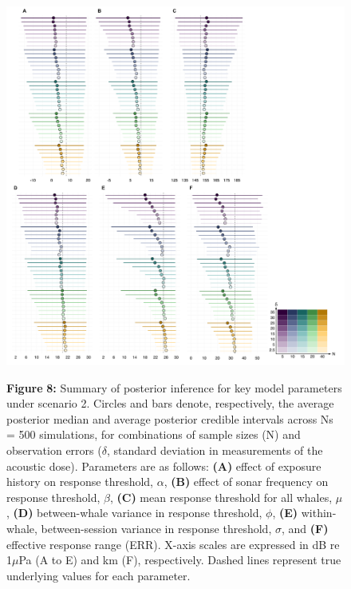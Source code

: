\documentclass[
]{article}
\begin{document}
\begin{figure}

{\centering \includegraphics[width=1.05\linewidth]{fig/fig_forestplot_S2} 

}

\textbf{Figure }{\textbf{8:} \hypertarget{fig8}{}Summary of posterior inference for key model parameters under scenario 2. Circles and bars denote, respectively, the average posterior median and average posterior credible intervals across Ns = 500 simulations, for combinations of sample sizes (N) and observation errors (\(\delta\), standard deviation in measurements of the acoustic dose). Parameters are as follows: \textbf{(A)} effect of exposure history on response threshold, \(\alpha\), \textbf{(B)} effect of sonar frequency on response threshold, \(\beta\), \textbf{(C)} mean response threshold for all whales, \(\mu\), \textbf{(D)} between-whale variance in response threshold, \(\phi\), \textbf{(E)} within-whale, between-session variance in response threshold, \(\sigma\), and \textbf{(F)} effective response range (ERR). X-axis scales are expressed in dB re 1\(\mu\)Pa (A to E) and km (F), respectively. Dashed lines represent true underlying values for each parameter.}\label{fig:unnamed-chunk-7}
\end{figure}
\end{document}
